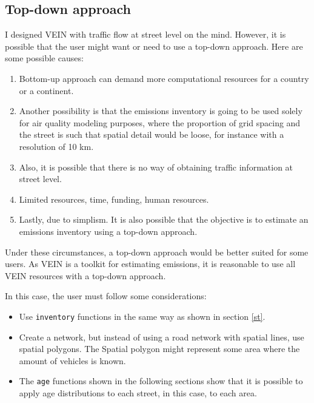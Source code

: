 \documentclass[12pt,graybox,envcountchap,sectrefs]{krantz}
\providecommand{\tightlist}{%
  \setlength{\itemsep}{0pt}\setlength{\parskip}{0pt}}
\theoremstyle{definition}
\theoremstyle{definition}
\theoremstyle{definition}
\theoremstyle{remark}
\begin{document}
\subsection{Top-down approach}\label{top-down-approach}

I designed VEIN with traffic flow at street level on the mind. However,
it is possible that the user might want or need to use a top-down
approach. Here are some possible causes:

\begin{enumerate}
\def\labelenumi{\arabic{enumi}.}
\tightlist
\item
  Bottom-up approach can demand more computational resources for a
  country or a continent.
\item
  Another possibility is that the emissions inventory is going to be
  used solely for air quality modeling purposes, where the proportion of
  grid spacing and the street is such that spatial detail would be
  loose, for instance with a resolution of 10 km.
\item
  Also, it is possible that there is no way of obtaining traffic
  information at street level.
\item
  Limited resources, time, funding, human resources.
\item
  Lastly, due to simplism. It is also possible that the objective is to
  estimate an emissions inventory using a top-down approach.
\end{enumerate}

Under these circumstances, a top-down approach would be better suited
for some users. As VEIN is a toolkit for estimating emissions, it is
reasonable to use all VEIN resources with a top-down approach.

In this case, the user must follow some considerations:

\begin{itemize}
\tightlist
\item
  Use \texttt{inventory} functions in the same way as shown in section
  \ref{st}.
\item
  Create a network, but instead of using a road network with spatial
  lines, use spatial polygons. The Spatial polygon might represent some
  area where the amount of vehicles is known.
\item
  The \texttt{age} functions shown in the following sections show that
  it is possible to apply age distributions to each street, in this
  case, to each area.
\end{itemize}
\end{document}
